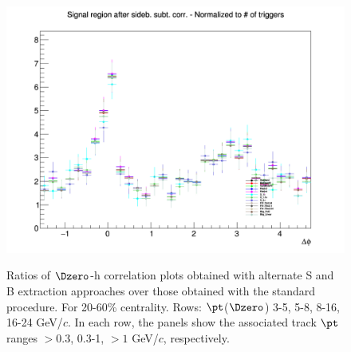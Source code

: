 \begin{figure}
{\includegraphics[width=0.31\linewidth]{figuresVsCent/Dzero/SystSandB/20_60/AzimCorrDistr_Dzero_Canvas_PtIntBins12to12_PoolInt_thr1to99_Superimp.png}} \\
 \caption{Ratios of $\Dzero$-h correlation plots obtained with alternate S and B extraction approaches over those obtained with the standard procedure. For 20-60\% centrality. Rows: $\pt$($\Dzero$) 3-5, 5-8, 8-16, 16-24 GeV/$c$. In each row, the panels show the associated track
$\pt$ ranges $> 0.3$, 0.3-1, $> 1$ GeV/$c$, respectively.}
\label{fig:SysSandB2060}
\end{figure}

